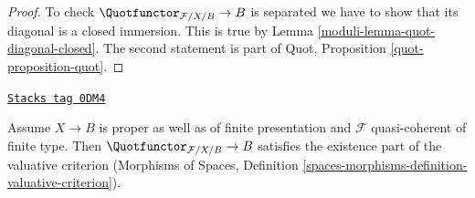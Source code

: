 \begin{proof}

To check $\Quotfunctor_{\mathcal{F}/X/B} \to B$ is separated we have to
show that its diagonal is a closed immersion. This
is true by Lemma \ref{moduli-lemma-quot-diagonal-closed}.
The second statement is part of
Quot, Proposition \ref{quot-proposition-quot}.
\end{proof}

\begin{lemma}
\label{moduli-lemma-quot-existence-part}
\href{https://stacks.math.columbia.edu/tag/0DM4}{\texttt{Stacks tag 0DM4}}

Assume $X \to B$ is proper as well as of finite presentation
and $\mathcal{F}$ quasi-coherent of finite type.
Then $\Quotfunctor_{\mathcal{F}/X/B} \to B$ satisfies the existence part
of the valuative criterion (Morphisms of Spaces, Definition
\ref{spaces-morphisms-definition-valuative-criterion}).
\end{lemma}

